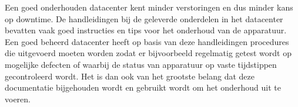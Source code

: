 Een goed onderhouden datacenter kent minder verstoringen en dus minder kans op downtime. De handleidingen bij de geleverde onderdelen in het datacenter bevatten vaak goed instructies en tips voor het onderhoud van de apparatuur. Een goed beheerd datacenter heeft op basis van deze handleidingen procedures die uitgevoerd moeten worden zodat er bijvoorbeeld regelmatig getest wordt op mogelijke defecten of waarbij de status van apparatuur op vaste tijdstippen gecontroleerd wordt. Het is dan ook van het grootste belang dat deze documentatie bijgehouden wordt en gebruikt wordt om het onderhoud uit te voeren.

